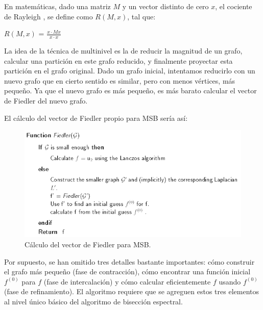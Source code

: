 \begin{mydef}\label{Rayleigh}
	En matemáticas, dado una matriz $M$ y un vector distinto de cero $x$, el cociente de Rayleigh , se define como $R(M, x)$, tal que:
	\begin{center}
		$R(M, x)$ = $\frac{x \cdot Mx}{x \cdot x}$
	\end{center}
\end{mydef}


La idea de la técnica de multinivel es la de reducir la magnitud de un grafo, calcular una partición en este grafo reducido, y finalmente proyectar esta partición en el grafo original. Dado un grafo inicial, intentamos reducirlo con un nuevo grafo que en cierto sentido es similar, pero con menos vértices, más pequeño. Ya que el nuevo grafo es más pequeño, es más barato calcular el vector de Fiedler del nuevo grafo.

El cálculo del vector de Fiedler propio para MSB sería así:

\begin{figure}[h]
	\centering
	\includegraphics[scale=0.8]{Figures/fiedler}
	\vspace{1mm}
	\caption{Cálculo del vector de Fiedler para MSB.}
	\label{fiedler}
\end{figure}

Por supuesto, se han omitido tres detalles bastante importantes: cómo construir el grafo más pequeño (fase de contracción), cómo encontrar una función inicial $f^(0)$ para $f$ (fase de intercalación) y cómo calcular eficientemente $f$ usando $f^(0)$ (fase de refinamiento). El algoritmo requiere que se agreguen estos tres elementos al nivel único básico del algoritmo de bisección espectral.

